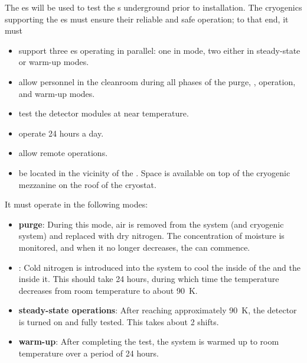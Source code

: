 \label{sec:fdsp-tc-cryocoldbox}


The  \coldbox{}es will be used to test the s underground prior to installation.  
The cryogenics supporting the \coldbox{}es  must ensure their reliable and safe operation; to that end, it must
\begin{itemize}
\setlength\itemsep{1mm}
\setlength{\parsep}{1mm}
\setlength{\itemsep}{-5mm}
\item support three \coldbox{}es operating in parallel: %
one in \cooldown mode, two either in steady-state or warm-up modes.
\item allow personnel in the cleanroom during all phases of the purge, \cooldown, operation, and warm-up modes. 
\item test the detector modules at near  temperature.
\item operate 24 hours a day.
\item allow remote operations.
\item be located in the vicinity of the . Space is available on top of the cryogenic mezzanine on the roof of the cryostat.
\end{itemize}

It must operate in the following modes: %

\begin{itemize}
\setlength\itemsep{1mm}
\setlength{\parsep}{1mm}
\setlength{\itemsep}{-5mm}
\item \textbf{purge}: During this mode, air is removed from the system (\coldbox and cryogenic system) and replaced with dry nitrogen. The concentration of moisture is monitored, and when it no longer decreases, the \cooldown can commence.
\item \textbf{\cooldown}: Cold nitrogen is introduced into the system to cool the inside of the \coldbox and the  inside it. 
This should take 24 hours, during which time the temperature decreases from room temperature to about \SI{90}{K}. 
\item \textbf{steady-state operations}: After reaching approximately \SI{90}{K}, 
the detector is turned on and fully tested. 
This takes about 2 shifts.
\item \textbf{warm-up}: After completing the test, the system is
warmed up to room temperature over a period of 24 hours. 
\end{itemize}

